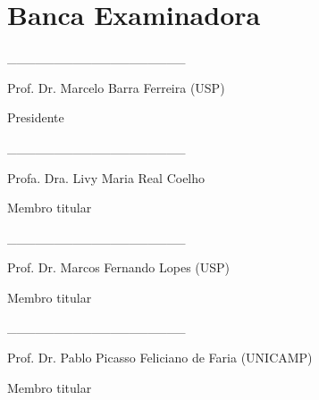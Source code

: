 \chapter*{Banca Examinadora}
\thispagestyle{empty}

  \vskip 2cm
    \_\_\_\_\_\_\_\_\_\_\_\_\_\_\_\_\_\_\_
  
    Prof. Dr. Marcelo Barra Ferreira (USP)
    
    Presidente
    \vskip 2cm
    
    \_\_\_\_\_\_\_\_\_\_\_\_\_\_\_\_\_\_\_
    
    Profa. Dra. Livy Maria Real Coelho
    
    Membro titular
    \vskip 2cm
    
    \_\_\_\_\_\_\_\_\_\_\_\_\_\_\_\_\_\_\_
      
    Prof. Dr. Marcos Fernando Lopes (USP)

    Membro titular

    \vskip 2cm
    \_\_\_\_\_\_\_\_\_\_\_\_\_\_\_\_\_\_\_
    

    Prof. Dr. Pablo Picasso Feliciano de Faria (UNICAMP) 
    
    Membro titular
 
 
